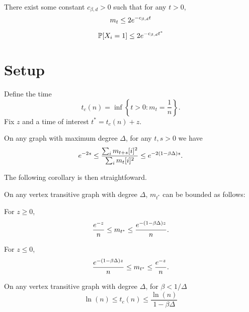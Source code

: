 \begin{lemma}
	There exist some constant $c_{\beta, d} > 0$ such that for any $t > 0$,
	\begin{equation}
		m_t \leq 2 e^{-c_{\beta, d} t}
	\end{equation}
\end{lemma}
\begin{corollary}
	\begin{equation}
		\mathbb{P}[X_i = 1] \leq 2 e^{-c_{\beta, d} t^*}
	\end{equation}
\end{corollary}

\section{Setup}
Define the time
\begin{equation}
	t_c(n) = \inf\left\{ t > 0 : m_t = \frac{1}{n}\right\}.
\end{equation}
Fix $z$ and a time of interest $t^* = t_c(n) + z$.

\begin{lemma}
	On any graph with maximum degree $\Delta$, for any $t, s > 0$ we have
	\begin{equation}
		e^{-2s} \leq \frac{\sum_i m_{t+s}[i]^2}{\sum_i m_t[i]^2} \leq e^{-2(1 - \beta \Delta)s}.
	\end{equation}
\end{lemma}

The following corollary is then straightfoward.
\begin{corollary}
	On any vertex transitive graph with degree $\Delta$, $m_{t^*}$ can be bounded as follows:

	For $z \geq 0$,
	\begin{equation}
		\frac{e^{-z}}{n} \leq m_{t^*} \leq \frac{e^{-(1 - \beta \Delta)z}}{n}.
	\end{equation}

	For $z \leq 0$,
	\begin{equation}
		\frac{e^{-(1 - \beta \Delta)z}}{n} \leq m_{t^*} \leq \frac{e^{-z}}{n}.
	\end{equation}
\end{corollary}

\begin{corollary}
	On any vertex transitive graph with degree $\Delta$, for $\beta < 1/\Delta$
	\begin{equation}
		\ln(n) \leq t_c(n) \leq \frac{\ln(n)}{1 - \beta \Delta}
	\end{equation}
\end{corollary}

